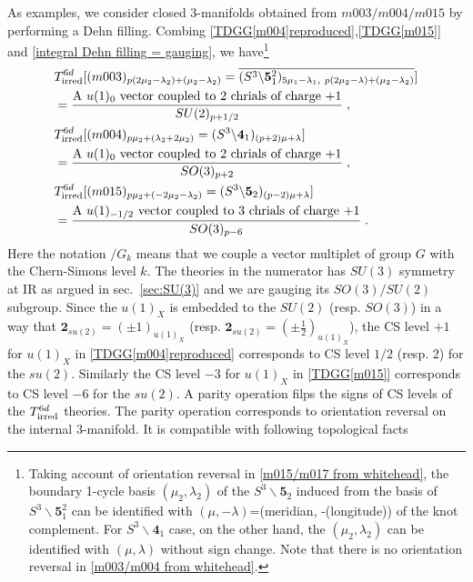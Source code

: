 \documentclass[a4paper,11pt]{article}
\begin{document}
As  examples, we  consider closed 3-manifolds obtained from $m003/m004/m015$ by performing a Dehn filling.  Combing \eqref{TDGG[m004]reproduced},\eqref{TDGG[m015]} and \eqref{integral Dehn filling = gauging}, we have\footnote{Taking account of orientation reversal in \eqref{m015/m017 from whitehead},  the boundary 1-cycle basis $(\mu_2, \lambda_2)$ of the $S^3\backslash \mathbf{5}_2$ induced from  the basis of  $S^3\backslash \mathbf{5}^2_1$  can be identified with $(\mu, -\lambda)$=(meridian, -(longitude)) of the knot complement.  For $S^3 \backslash \mathbf{4}_1$ case, on the other hand, the $(\mu_2, \lambda_2)$ can be identified with $(\mu, \lambda)$ without sign change. Note that there is no orientation reversal in \eqref{m003/m004 from whitehead}. }
%
\begin{align}
\begin{split}
&T^{6d}_{\rm irred}[(m003)_{ p(2\mu_2-\lambda_2)+(\mu_2-\lambda_2)} = \overline{(S^3\backslash \mathbf{5}^2_1)_{5\mu_1 -  \lambda_1,~ p(2\mu_2-\lambda)+(\mu_2-\lambda_2)}} ]
\\
& = \frac{\textrm{A $u(1)_0$ vector coupled to 2 chrials of charge +1}  }{SU(2)_{p+1/2}}\;,
\\
&T^{6d}_{\rm irred}[(m004)_{ p \mu_2 + (\lambda_2+2 \mu_2)} =(S^3\backslash \mathbf{4}_1)_{(p+2) \mu + \lambda} ]
\\
& = \frac{\textrm{A $u(1)_0$ vector coupled to 2 chrials of charge +1}  }{SO(3)_{p+2}}\;,
\\
&T^{6d}_{\rm irred}[(m015)_{ p \mu_2 + (-2\mu_2- \lambda_2)} =(S^3\backslash \mathbf{5}_2)_{(p-2)\mu + \lambda}]
\\
& = \frac{\textrm{A $u(1)_{-1/2}$ vector coupled to 3 chrials of charge +1}  }{SO(3)_{p-6}}\;.
 \label{Theory for m003/m004 Dehn-filled}
\end{split}
\end{align}
%
Here the notation $/G_k$ means that we couple a vector multiplet of group $G$ with the Chern-Simons level $k$. The theories in the numerator has $SU(3)$ symmetry at IR as argued in sec.~\ref{sec:SU(3)} and we are gauging its $SO(3)/SU(2)$ subgroup. Since the $u(1)_X$ is embedded to the $SU(2)$ (resp. $SO(3)$) in a way that $\mathbf{2}_{su(2)} = (\pm 1)_{u(1)_X}$ (resp. $\mathbf{2}_{su(2)} = (\pm \frac{1}2)_{u(1)_X}$), the CS level $+1$  for $u(1)_X$ in \eqref{TDGG[m004]reproduced} corresponds to CS level $1/2$ (resp. 2) for the $su(2)$. Similarly the CS level $-3$ for $u(1)_X$ in \eqref{TDGG[m015]} corresponds to CS level $-6$ for the $su(2)$. A parity operation filps the  signs of  CS levels of the $T^{6d}_{\rm irred}$ theories. The parity operation corresponds to orientation reversal on the internal 3-manifold. It is compatible with following topological facts
\end{document}
